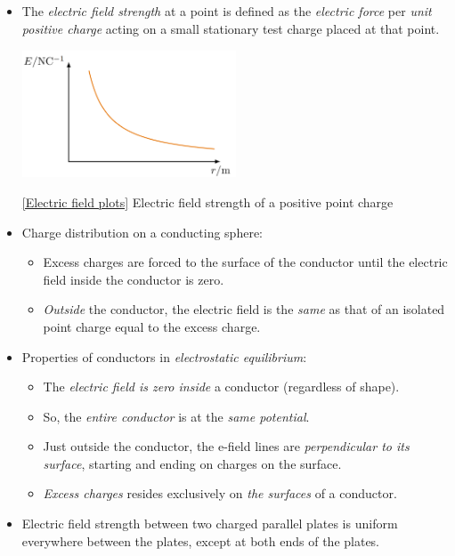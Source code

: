 \documentclass[oneside]{book}
\begin{document}
\begin{itemize}
\begin{center}
    \captionsetup{type=figure}
    \caption[figure]{\ref{Interaction of a point charge with a charged plate} Interaction of a point charge with a charged plate.}
  \end{center}
  \item The \emph{electric field strength} at a point is defined as the \emph{electric force} per \emph{unit positive charge} acting on a small stationary test charge placed at that point.
  \begin{center}
    \includegraphics[width=0.5\textwidth]{../images/ElectricFieldStrengthPlot.png}
    \captionsetup{type=figure}
    \caption[figure]{\ref{Electric field plots} Electric field strength of a positive point charge}
  \end{center}
  \item Charge distribution on a conducting sphere: 
  \begin{itemize}
    \item Excess charges are forced to the surface of the conductor until the electric field inside the conductor is zero. 
    \item \emph{Outside} the conductor, the electric field is the \emph{same} as that of an isolated point charge equal to the excess charge. 
  \end{itemize}
  \item Properties of conductors in \emph{electrostatic equilibrium}:
  \begin{itemize}
    \item The \emph{electric field is zero inside} a conductor (regardless of shape).
    \item So, the \emph{entire conductor} is at the \emph{same potential}.
    \item Just outside the conductor, the e-field lines are \emph{perpendicular to its surface}, starting and ending on charges on the surface.
    \item \emph{Excess charges} resides exclusively on \emph{the surfaces} of a conductor.
  \end{itemize}
  \item Electric field strength between two charged parallel plates is uniform everywhere between the plates, except at both ends of the plates. 

\end{itemize}
\end{document}
